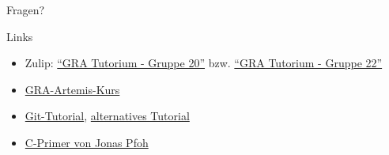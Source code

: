 \begin{frame}[c]{}{}
	\begin{center}
		\LARGE Fragen?
	\end{center}
\end{frame}

\begin{frame}[fragile, c]{Links}{}
	\begin{itemize}
		\item Zulip: \href{https://zulip.in.tum.de/#narrow/stream/2267-GRA-Tutorium---Gruppe-20}{\enquote{GRA Tutorium - Gruppe 20}}
		      bzw. \href{https://zulip.in.tum.de/#narrow/stream/2269-GRA-Tutorium---Gruppe-22}{\enquote{GRA Tutorium - Gruppe 22}}
		\item \href{https://artemis.in.tum.de/courses/329}{GRA-Artemis-Kurs}
		\item \href{https://git-scm.com/docs/gittutorial}{Git-Tutorial}, \href{https://rogerdudler.github.io/git-guide/}{alternatives Tutorial}
		\item \href{https://www.sec.in.tum.de/i20/assets/vorlesung/c_primer.pdf}{C-Primer von Jonas Pfoh}
	\end{itemize}
\end{frame}

\maketitle


